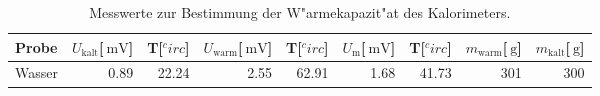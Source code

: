 \begin{table}[!h]
\begin{center}
\begin{tabular}{|l|r|r|r|r|r|r|r|r|}
\hline
Probe & $U_\mathrm{kalt}$[$\SI{}{\milli\volt}$] & T[$^circ$] & $U_\mathrm{warm}$[$\SI{}{\milli\volt}$] & T[$^circ$] & $U_\mathrm{m}$[$\SI{}{\milli\volt}$] & T[$^circ$] & $m_\mathrm{warm}$[$\SI{}{\gram}$] & $m_\mathrm{kalt}$[$\SI{}{\gram}$]\\
\hline
\hline
Wasser & 0.89 & 22.24 & 2.55 & 62.91 & 1.68 & 41.73 & 301 & 300 \\
\hline
\end{tabular}
\caption[]{Messwerte zur Bestimmung der W"armekapazit"at des Kalorimeters.}
\label{kalo}
\end{center}
\end{table}